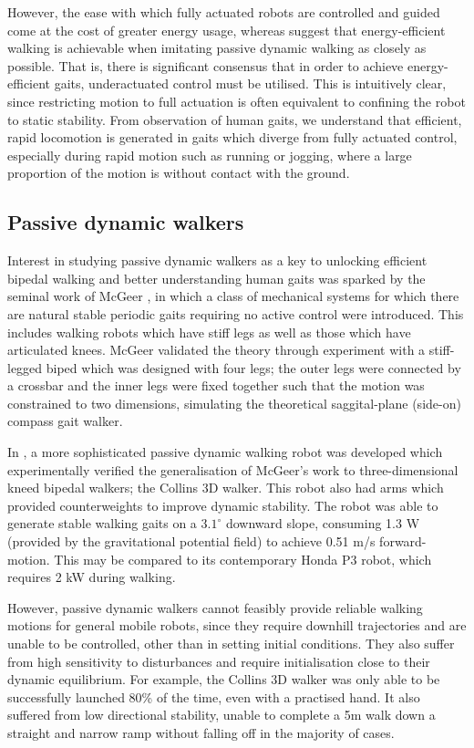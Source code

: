 However, the ease with which fully actuated robots are controlled and guided come at the cost of greater energy usage, whereas \cite{mcgeer1990passive, asano2007dynamic, byl2008approximate} suggest that energy-efficient walking is achievable when imitating passive dynamic walking as closely as possible. That is, there is significant consensus that in order to achieve energy-efficient gaits, underactuated control must be utilised. This is intuitively clear, since restricting motion to full actuation is often equivalent to confining the robot to static stability. From observation of human gaits, we understand that efficient, rapid locomotion is generated in gaits which diverge from fully actuated control, especially during rapid motion such as running or jogging, where a large proportion of the motion is without contact with the ground.

\subsection{Passive dynamic walkers}
Interest in studying passive dynamic walkers as a key to unlocking efficient bipedal walking and better understanding human gaits was sparked by the seminal work of McGeer \cite{mcgeer1990passive}, in which a class of mechanical systems for which there are natural stable periodic gaits requiring no active control were introduced. This includes walking robots which have stiff legs as well as those which have articulated knees. McGeer validated the theory through experiment with a stiff-legged biped which was designed with four legs; the outer legs were connected by a crossbar and the inner legs were fixed together such that the motion was constrained to two dimensions, simulating the theoretical saggital-plane (side-on) compass gait walker.

In \cite{collins2001three}, a more sophisticated passive dynamic walking robot was developed which experimentally verified the generalisation of McGeer's work to three-dimensional kneed bipedal walkers; the Collins 3D walker. This robot also had arms which provided counterweights to improve dynamic stability. The robot was able to generate stable walking gaits on a $3.1^{\circ}$ downward slope, consuming 1.3 W (provided by the gravitational potential field) to achieve 0.51 m/s forward-motion. This may be compared to its contemporary Honda P3 robot, which requires 2 kW during walking.

However, passive dynamic walkers cannot feasibly provide reliable walking motions for general mobile robots, since they require downhill trajectories and are unable to be controlled, other than in setting initial conditions. They also suffer from high sensitivity to disturbances and require initialisation close to their dynamic equilibrium. For example, the Collins 3D walker was only able to be successfully launched 80\% of the time, even with a practised hand. It also suffered from low directional stability, unable to complete a 5m walk down a straight and narrow ramp without falling off in the majority of cases.

